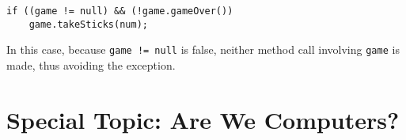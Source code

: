 \begin{jjjlisting}
\begin{lstlisting}
if ((game != null) && (!game.gameOver())
    game.takeSticks(num);
\end{lstlisting}
\end{jjjlisting}

\noindent In this case, because {\tt game != null} is false,
neither method call involving {\tt game} is made, thus avoiding the
exception.

\label{self-study-exercise}




\section*{{\color{cyan}Special Topic:} Are We Computers?}

